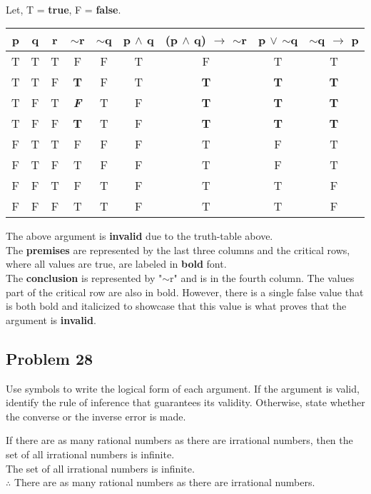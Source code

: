 \documentclass{article}
\begin{document}
\\ Let, T = \textbf{true}, F = \textbf{false}.
\begin{center}
	\begin{tabular}{ |c|c|c|c|c|c|c|c|c| } 
		\hline
		p & q & r & $\sim$r & $\sim$q & p $\wedge$ q & (p $\wedge$ q) $\rightarrow$ $\sim$r & p $\vee$ $\sim$q & $\sim$q $\rightarrow$ p\\ 
		\hline
		T & T & T & F & F & T & F & T & T \\ 
		T & T & F & \textbf{T} & F & T & \textbf{T} & \textbf{T} & \textbf{T} \\ 
		T & F & T & \textit{\textbf{F}} & T & F & \textbf{T} & \textbf{T} & \textbf{T} \\ 
		T & F & F & \textbf{T} & T & F & \textbf{T} & \textbf{T} & \textbf{T} \\
		F & T & T & F & F & F & T & F & T \\ 
		F & T & F & T & F & F & T & F & T \\
		F & F & T & F & T & F & T & T & F \\ 
		F & F & F & T & T & F & T & T & F \\
		\hline
	\end{tabular}
\end{center}

The above argument is \textbf{invalid} due to the truth-table above.
\\ The \textbf{premises} are represented by the last three columns and the critical rows, where all values are true, are labeled in \textbf{bold} font. 
\\The \textbf{conclusion} is represented by "$\sim$r" and is in the fourth column. The values part of the critical row are also in bold. However, there is a single false value that is both bold and italicized to showcase that this value is what proves that the argument is \textbf{invalid}.

\subsection*{Problem 28}
Use symbols to write the logical form of each argument. If the argument is valid, identify the rule of inference that guarantees its validity. Otherwise, state whether the converse or the inverse error is made.

If there are as many rational numbers as there are
irrational numbers, then the set of all irrational numbers
is infinite.
\\The set of all irrational numbers is infinite.
\\$\therefore$ There are as many rational numbers as there are irrational numbers.
\end{document}
